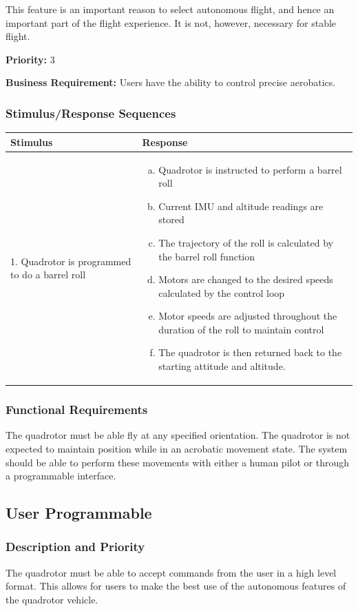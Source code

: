 \documentclass[english]{article}
\numberwithin{equation}{section} %
\begin{document}
This feature is an important reason to select autonomous flight, and hence an important part of the flight experience. It is not, however, necessary for stable flight.

\textbf{Priority:} 3

\textbf{Business Requirement:} Users have the ability to control precise aerobatics.

\subsubsection{Stimulus/Response Sequences}

\begin{tabular}{p{3cm} | p{8.5cm}}
\hline
\textbf{Stimulus} & \textbf{Response}\\
\hline
1. Quadrotor is programmed to do a barrel roll &
\begin{enumerate}[(a)]\itemsep1pt %
\item Quadrotor is instructed to perform a barrel roll
\item Current IMU and altitude readings are stored
\item The trajectory of the roll is calculated by the barrel roll function
\item Motors are changed to the desired speeds calculated by the control loop
\item Motor speeds are adjusted throughout the duration of the roll to maintain control
\item The quadrotor is then returned back to the starting attitude and altitude.
\end{enumerate}
\\ 
\hline
\end{tabular}
\subsubsection{Functional Requirements}
The quadrotor must be able fly at any specified orientation. The quadrotor is not expected to maintain position while in an acrobatic movement state. The system should be able to perform these movements with either a human pilot or through a programmable interface.




\bigskip
\subsection{User Programmable}
\subsubsection{Description and Priority}
The quadrotor must be able to accept commands from the user in a high level format. This allows for users to make the best use of the autonomous features of the quadrotor vehicle.
\end{document}
